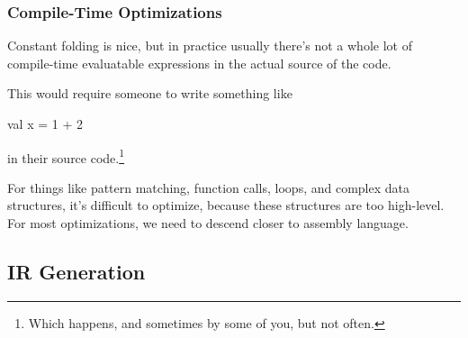 \documentclass[aspectratio=169]{beamer}
\begin{document}
\begin{frame}[fragile]
  \frametitle{Compile-Time Optimizations}

  Constant folding is nice, but in practice usually there's not a whole lot of
  compile-time evaluatable expressions in the actual source of the code.

  \pause
  \vspace{\fill}

  This would require someone to write something like
  \begin{codeblock}
    val x = 1 + 2
  \end{codeblock}
  in their source code.\footnote<2->{Which happens, and sometimes by some of you,
  but not often.}

  \pause
  \vspace{\fill}

  For things like pattern matching, function calls, loops, and complex
  data structures, it's difficult to optimize, because these structures are
  too high-level. For most optimizations, we need to descend closer to assembly
  language.
\end{frame}

\subsection{\color{presentColor}IR Generation}
\end{document}

